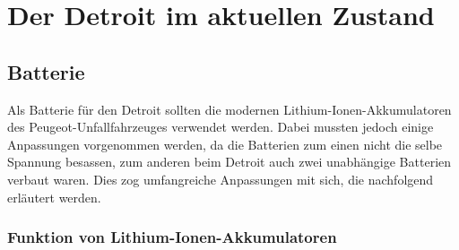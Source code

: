 \chapter{Der Detroit im aktuellen Zustand}

\section{Batterie}
Als Batterie für den Detroit sollten die modernen Lithium-Ionen-Akkumulatoren des Peugeot-Unfallfahrzeuges verwendet werden. Dabei mussten jedoch einige Anpassungen vorgenommen werden, da die Batterien zum einen nicht die selbe Spannung besassen, zum anderen beim Detroit auch zwei unabhängige Batterien verbaut waren. Dies zog umfangreiche Anpassungen mit sich, die nachfolgend erläutert werden.

\subsection{Funktion von Lithium-Ionen-Akkumulatoren}